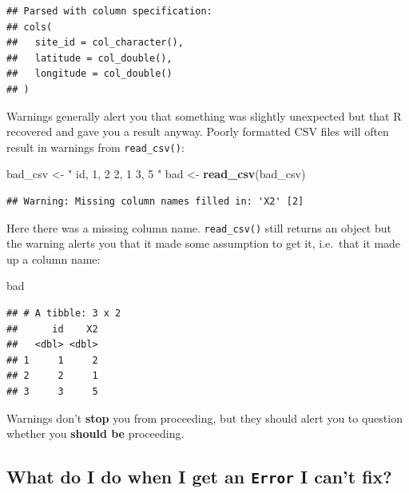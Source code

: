 \documentclass[]{Nemilov}
\newenvironment{Shaded}{\begin{snugshade}}{\end{snugshade}}
\newcommand{\KeywordTok}[1]{\textcolor[rgb]{0.13,0.29,0.53}{\textbf{#1}}}
\newcommand{\NormalTok}[1]{#1}
\newcommand{\StringTok}[1]{\textcolor[rgb]{0.31,0.60,0.02}{#1}}
\begin{document}
\begin{verbatim}
## Parsed with column specification:
## cols(
##   site_id = col_character(),
##   latitude = col_double(),
##   longitude = col_double()
## )
\end{verbatim}

Warnings generally alert you that something was slightly unexpected but that R recovered and gave you a result anyway. Poorly formatted CSV files will often result in warnings from \texttt{read\_csv()}:

\begin{Shaded}
\begin{Highlighting}[]
\NormalTok{bad_csv <-}\StringTok{ "}
\StringTok{id,}
\StringTok{1, 2}
\StringTok{2, 1}
\StringTok{3, 5}
\StringTok{"}
\NormalTok{bad <-}\StringTok{ }\KeywordTok{read_csv}\NormalTok{(bad_csv)}
\end{Highlighting}
\end{Shaded}

\begin{verbatim}
## Warning: Missing column names filled in: 'X2' [2]
\end{verbatim}

Here there was a missing column name. \texttt{read\_csv()} still returns an object but the warning alerts you that it made some assumption to get it, i.e.~that it made up a column name:

\begin{Shaded}
\begin{Highlighting}[]
\NormalTok{bad}
\end{Highlighting}
\end{Shaded}

\begin{verbatim}
## # A tibble: 3 x 2
##      id    X2
##   <dbl> <dbl>
## 1     1     2
## 2     2     1
## 3     3     5
\end{verbatim}

Warnings don't \textbf{stop} you from proceeding, but they should alert you to question whether you \textbf{should be} proceeding.

\hypertarget{what-do-i-do-when-i-get-an-error-i-cant-fix}{%
\subsection{\texorpdfstring{What do I do when I get an \texttt{Error} I can't fix?}{What do I do when I get an Error I can't fix?}}\label{what-do-i-do-when-i-get-an-error-i-cant-fix}}
\end{document}
